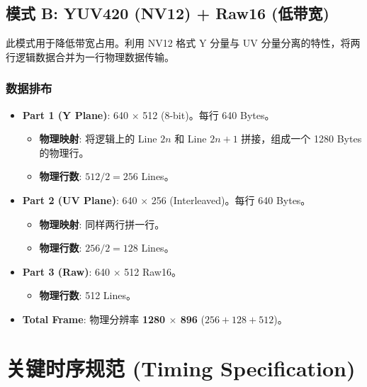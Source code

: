\documentclass[UTF8]{ctexart}
\begin{document}
\subsection{模式 B: YUV420 (NV12) + Raw16 (低带宽)}

此模式用于降低带宽占用。利用 NV12 格式 Y 分量与 UV 分量分离的特性，将两行逻辑数据合并为一行物理数据传输。

\subsubsection{数据排布}

\begin{itemize}
    \item \textbf{Part 1 (Y Plane)}: 640 $\times$ 512 (8-bit)。每行 640 Bytes。
        \begin{itemize}
            \item \textbf{物理映射}: 将逻辑上的 Line $2n$ 和 Line $2n+1$ 拼接，组成一个 1280 Bytes 的物理行。
            \item \textbf{物理行数}: $512 / 2 = 256$ Lines。
        \end{itemize}
    \item \textbf{Part 2 (UV Plane)}: 640 $\times$ 256 (Interleaved)。每行 640 Bytes。
        \begin{itemize}
            \item \textbf{物理映射}: 同样两行拼一行。
            \item \textbf{物理行数}: $256 / 2 = 128$ Lines。
        \end{itemize}
    \item \textbf{Part 3 (Raw)}: 640 $\times$ 512 Raw16。
        \begin{itemize}
            \item \textbf{物理行数}: 512 Lines。
        \end{itemize}
    \item \textbf{Total Frame}: 物理分辨率 \textbf{1280 $\times$ 896} ($256+128+512$)。
\end{itemize}

\newpage


\section{关键时序规范 (Timing Specification)}
\end{document}
